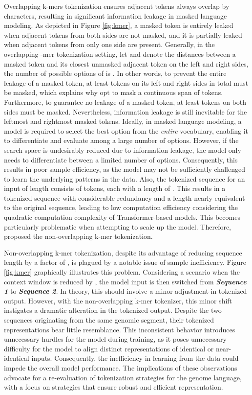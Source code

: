 \documentclass{article}
\begin{document}
Overlapping k-mers tokenization ensures adjacent tokens always overlap by  characters, resulting in significant information leakage in masked language modeling. 
As depicted in Figure \ref{fig:kmer}, a masked token is entirely leaked when adjacent tokens from both sides are not masked, and it is partially leaked when adjacent tokens from only one side are present.
Generally, in the overlapping -mer tokenization setting, let  and  denote the distances between a masked token  and its closest unmasked adjacent token on the left and right sides, the number of possible options of  is . 
In other words, to prevent the entire leakage of a masked token, at least  tokens on its left and right sides in total must be masked, which explains why \citet{dnabert} opt to mask a continuous span of  tokens. 
Furthermore, to guarantee no leakage of a masked token, at least  tokens on both sides must be masked. 
Nevertheless, information leakage is still inevitable for the leftmost and rightmost  masked tokens. 
Ideally, in masked language modeling, a model is required to select the best option from the \textit{entire} vocabulary, enabling it to differentiate and evaluate among a large number of options. However, if the search space is undesirably reduced due to information leakage, the model only needs to differentiate between a limited number of options. Consequently, this results in poor sample efficiency, as the model may not be sufficiently challenged to learn the underlying patterns in the data. Also, the tokenized sequence for an input of length  consists of  tokens, each with a length of . This results in a tokenized sequence with considerable redundancy and a length nearly equivalent to the original sequence, leading to low computation efficiency considering the quadratic computation complexity of Transformer-based \citep{transformer} models.
This becomes particularly problematic when attempting to scale up the model. Therefore, \citet{nt} proposed the non-overlapping k-mer tokenization.

Non-overlapping k-mer tokenization, despite its advantage of reducing sequence length by a factor of , is plagued by a notable issue of sample inefficiency. Figure \ref{fig:kmer} graphically illustrates this problem. Considering a scenario when the context window is reduced by , the model input is then switched from \textit{\textbf{Sequence 1}} to \textit{\textbf{Sequence 2}}. In theory, this should involve a minor adjustment in tokenized output.
However, with the non-overlapping k-mer tokenizer, this minor shift instigates a dramatic alteration in the tokenized output. Despite the two sequences originating from the same genomic segment, their tokenized representations bear little resemblance. This inconsistent behavior introduces unnecessary hurdles for the model during training, as it poses unnecessary difficulty for the model to align distinct representations of identical or near-identical inputs. Consequently, the inefficiency in learning from the data could impede the overall model performance. The implications of these observations advocate for a re-evaluation of tokenization strategies for the genome language, with a focus on strategies that ensure robust and efficient representation.
\end{document}
